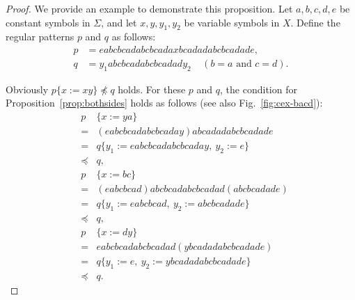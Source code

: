 \begin{proof}
We provide an example to demonstrate this proposition.
Let $a,b,c,d,e$ be constant symbols in $\Sigma$, and let 
$x,y,y_{1},y_{2}$ be variable symbols in $X$.
Define the regular patterns $p$ and $q$ as follows:
\begin{align*}
p &= eabcbcadabcbcadaxbcadadabcbcadade,\\
q &= y_{1}abcbcadabcbcadady_{2}~~~~~(b = a\mbox{~and~}c = d).
\end{align*}

\noindent
Obviously $p \{ x:=xy \} \not \preceq q$ holds.
For these $p$ and $q$, the condition for Proposition~\ref{prop:bothsides} holds as follows (see also Fig.~\ref{fig:cex-bacd}):
\begin{eqnarray*}
&p& \{ x:=ya \} \\ 
& = & (eabcbcadabcbcaday)abcadadabcbcadade\\
& = & q \{ y_{1} := eabcbcadabcbcaday,~y_{2}:=e \} \\
& \preceq & q,\\
&p& \{ x:=bc \}  \\
& = & (eabcbcad)abcbcadabcbcadad(abcbcadade) \\
& = & q \{ y_{1} := eabcbcad,~y_{2} := abcbcadade \} \\
& \preceq & q,\\
&p& \{ x:=dy \}  \\
& = & eabcbcadabcbcadad(ybcadadabcbcadade) \\
& = & q \{ y_{1}:=e,~y_{2} := ybcadadabcbcadade \} \\
& \preceq & q.
\end{eqnarray*}
\end{proof}

